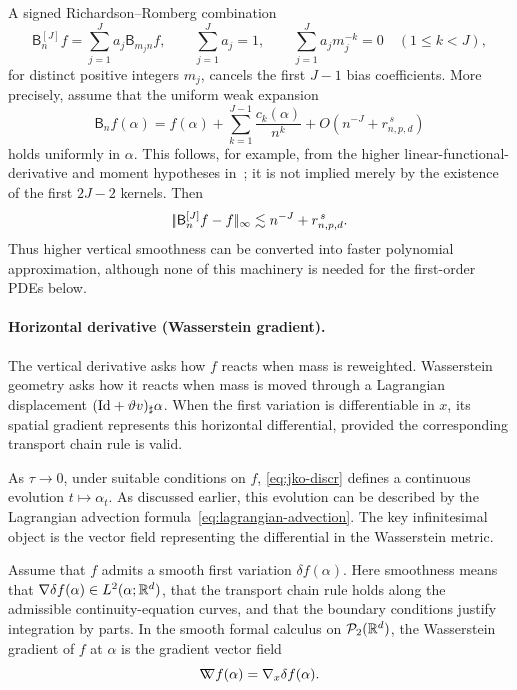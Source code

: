 \begin{rem}
	A signed Richardson--Romberg combination
	\[
		\mathsf B_n^{[J]}f
		=
		\sum_{j=1}^J a_j\mathsf B_{m_jn}f,
		\qquad
		\sum_{j=1}^J a_j=1,
		\qquad
		\sum_{j=1}^J a_jm_j^{-k}=0
		\quad (1\leq k<J),
	\]
	for distinct positive integers \(m_j\), cancels the first \(J-1\) bias coefficients. More precisely, assume that the uniform weak expansion
	\[
		\mathsf B_n f(\alpha)
		=
		f(\alpha)+\sum_{k=1}^{J-1}\frac{c_k(\alpha)}{n^k}
		+O\!\left(n^{-J}+r_{n,p,d}^{\,s}\right)
	\]
	holds uniformly in \(\alpha\). This follows, for example, from the higher linear-functional-derivative and moment hypotheses in~\cite{ChassagneuxSzpruchTse2022}; it is not implied merely by the existence of the first \(2J-2\) kernels. Then
	\[
		|\!| \mathsf B_n^{[J]}f-f |\!|_\infty
		\lesssim
		n^{-J}+r_{n,p,d}^{\,s}.
	\]
	Thus higher vertical smoothness can be converted into faster polynomial approximation, although none of this machinery is needed for the first-order PDEs below.
\end{rem}


\paragraph{Horizontal derivative (Wasserstein gradient).}

The vertical derivative asks how \(f\) reacts when mass is reweighted. Wasserstein geometry asks how it reacts when mass is moved through a Lagrangian displacement \((\mathrm{Id}+\vartheta v)_\sharp\alpha\). When the first variation is differentiable in \(x\), its spatial gradient represents this horizontal differential, provided the corresponding transport chain rule is valid.

As \(\tau\to0\), under suitable conditions on \(f\), \eqref{eq:jko-discr} defines a continuous evolution \(t\mapsto\alpha_t\). As discussed earlier, this evolution can be described by the Lagrangian advection formula~\eqref{eq:lagrangian-advection}. The key infinitesimal object is the vector field representing the differential in the Wasserstein metric.

\begin{defn}\label{def-wasserstein-gradient}
	Assume that $f$ admits a smooth first variation $\delta f(\alpha)$. Here smoothness means that $\nabla\delta f(\alpha)\in L^2(\alpha;\mathbb{R}^d)$, that the transport chain rule holds along the admissible continuity-equation curves, and that the boundary conditions justify integration by parts. In the smooth formal calculus on $\mathcal{P}_2(\mathbb{R}^d)$, the Wasserstein gradient of $f$ at $\alpha$ is the gradient vector field
	\begin{equation*}
	    \mathord{\nabla\mkern-9.3mu\nabla} f(\alpha) = \nabla_x \delta f(\alpha).
	\end{equation*}
\end{defn}

